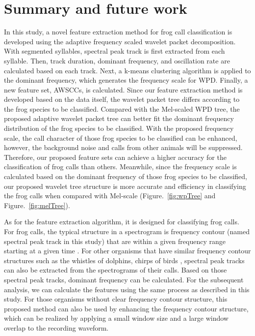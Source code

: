 \section{Summary and future work}
In this study, a novel feature extraction method for frog call classification is developed using the adaptive frequency scaled wavelet packet decomposition. With segmented syllables, spectral peak track is first extracted from each syllable. Then, track duration, dominant frequency, and oscillation rate are calculated based on each track. Next, a k-means clustering algorithm is applied to the dominant frequency, which generates the frequency scale for WPD. Finally, a new feature set, AWSCCs, is calculated. Since our feature extraction method is developed based on the data itself, the wavelet packet tree differs according to the frog species to be classified. Compared with the Mel-scaled WPD tree, the proposed adaptive wavelet packet tree can better fit the dominant frequency distribution of the frog species to be classified. With the proposed frequency scale, the call character of those frog species to be classified can be enhanced, however, the background noise and calls from other animals will be suppressed. Therefore, our proposed feature sets can achieve a higher accuracy for the classification of frog calls than others. Meanwhile, since the frequency scale is calculated based on the dominant frequency of those frog species to be classified, our proposed wavelet tree structure is more accurate and efficiency in classifying the frog calls when compared with Mel-scale (Figure.~\ref{fig:wpTree} and Figure.~\ref{fig:melTree}).


As for the feature extraction algorithm, it is designed for classifying frog calls. For frog calls, the typical structure in a spectrogram is frequency contour (named spectral peak track in this study) that are within a given frequency range starting at a given time \citep{mellinger2011method}. For other organisms that have similar frequency contour structures such as the whistles of dolphins, chirps of birds \citep{chen2006semi}, spectral peak tracks can also be extracted from the spectrograms of their calls. Based on those spectral peak tracks, dominant frequency can be calculated. For the subsequent analysis, we can calculate the features using the same process as described in this study. For those organisms without clear frequency contour structure, this proposed method can also be used by enhancing the frequency contour structure, which can be realized by applying a small window size and a large window overlap to the recording waveform. 


